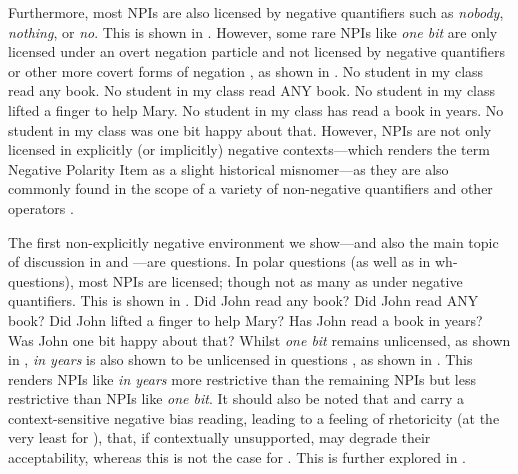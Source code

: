 Furthermore, most NPIs are also licensed by negative quantifiers such as \textit{nobody}, \textit{nothing}, or \textit{no}. This is shown in . However, some rare NPIs like \textit{one bit} are only licensed under an overt negation particle and not licensed by negative quantifiers or other more covert forms of negation \parencite{Zwarts1993,Zwarts1998}, as shown in .
\pex\label{ex:npi-dm}
\a No student in my class read any book.
\a No student in my class read \MakeUppercase{any} book.
\a No student in my class lifted a finger to help Mary.
\a No student in my class has read a book in years.
\a\ljudge{\#} No student in my class was one bit happy about that.
\xe
However, NPIs are not only licensed in explicitly (or implicitly) negative contexts---which renders the term Negative Polarity Item as a slight historical misnomer---as they are also commonly found in the scope of a variety of non-negative quantifiers and other operators \parencite[see, amongst many subsequent others,][]{Klima1964,Ladusaw1980,Hoeksema1983,Linebarger1987,Wouden1997,Giannakidou1998}.

The first non-explicitly negative environment we show---and also the main topic of discussion in  and ---are questions. In polar questions (as well as in wh-questions), most NPIs are licensed; though not as many as under negative quantifiers. This is shown in . 
\pex\label{ex:npi-question}
\a Did John read any book?
\a Did John read \MakeUppercase{any} book?
\a Did John lifted a finger to help Mary?
\a\ljudge{\#} Has John read a book in years?
\a\ljudge{\#} Was John one bit happy about that?
\xe
Whilst \textit{one bit} remains unlicensed, as shown in , \textit{in years} is also shown to be unlicensed in questions \parencite{Nicolae2015,Roelofsen2018,Jeong2021,Jeong2022}, as shown in . This renders NPIs like \textit{in years} more restrictive than the remaining NPIs but less restrictive than NPIs like \textit{one bit}. It should also be noted that  and  carry a context-sensitive negative bias reading, leading to a feeling of rhetoricity (at the very least for ), that, if contextually unsupported, may degrade their acceptability, whereas this is not the case for . This is further explored in .

